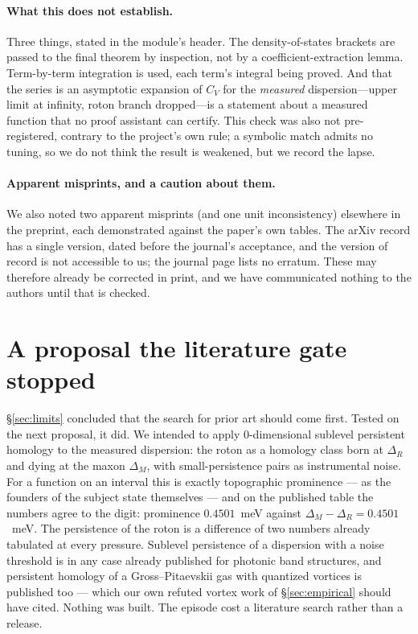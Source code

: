 \documentclass[11pt,a4paper]{article}
\theoremstyle{definition}
\begin{document}
\paragraph{What this does not establish.} Three things, stated in the module's header. The density-of-states
brackets are passed to the final theorem by inspection, not by a coefficient-extraction lemma.
Term-by-term integration is used, each term's integral being proved. And that the series is an
asymptotic expansion of $C_V$ for the \emph{measured} dispersion---upper limit at infinity, roton branch
dropped---is a statement about a measured function that no proof assistant can certify. This check was
also not pre-registered, contrary to the project's own rule; a symbolic match admits no tuning, so we do
not think the result is weakened, but we record the lapse.

\paragraph{Apparent misprints, and a caution about them.} We also noted two apparent misprints (and one
unit inconsistency) elsewhere in the preprint, each demonstrated against the paper's own tables. The
arXiv record has a single version, dated before the journal's acceptance, and the version of record is
not accessible to us; the journal page lists no erratum. These may therefore already be corrected in
print, and we have communicated nothing to the authors until that is checked.

\section{A proposal the literature gate stopped}
\label{sec:gate}

\S\ref{sec:limits} concluded that the search for prior art should come first. Tested on the next
proposal, it did. We intended to apply $0$-dimensional sublevel persistent homology to the measured
dispersion: the roton as a homology class born at $\Delta_R$ and dying at the maxon $\Delta_M$, with
small-persistence pairs as instrumental noise. For a function on an interval this is exactly
topographic prominence --- as the founders of the subject state themselves --- and on the published
table the numbers agree to the digit: prominence $0.4501$~meV against $\Delta_M - \Delta_R =
0.4501$~meV. The persistence of the roton is a difference of two numbers already tabulated at every
pressure. Sublevel persistence of a dispersion with a noise threshold is in any case already
published for photonic band structures, and persistent homology of a Gross--Pitaevskii gas with
quantized vortices is published too --- which our own refuted vortex work of \S\ref{sec:empirical}
should have cited. Nothing was built. The episode cost a literature search rather than a release.
\end{document}
